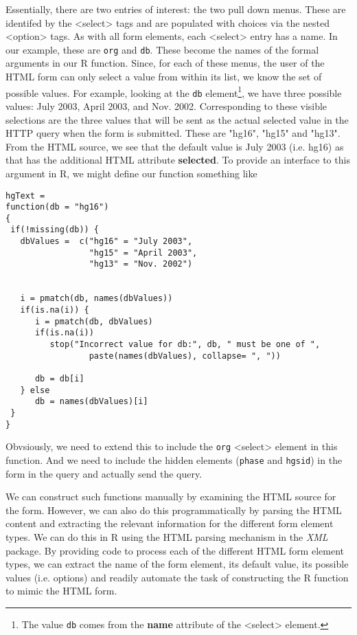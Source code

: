 \documentclass{article}
\def\HTMLTag#1{<#1>}
\def\HTMLAttr#1{\textbf{#1}}
\def\SPackage#1{\textit{#1}}
\begin{document}
Essentially, there are two entries of interest: the two pull down
menus. These are identifed by the \HTMLTag{select} tags and are
populated with choices via the nested \HTMLTag{option} tags.
As with all form elements, each 
\HTMLTag{select} entry has a name.
In our example, these are  \texttt{org} and \texttt{db}.
These become the names of the formal arguments in our
R function.
Since, for each of these menus, the user of the HTML form can only select
a value from within its list, we know the set of possible values.
For example, looking at the \texttt{db} element\footnote{The value
\texttt{db} comes from the \HTMLAttr{name} attribute of the
\HTMLTag{select} element.}, we
have three possible values:
 July 2003, April 2003, and  Nov. 2002.
Corresponding to these visible selections
are the three values that will be sent as
the actual selected value in the HTTP query
when the form is submitted. These are 
"hg16", "hg15" and "hg13".
From the HTML source, we see that the 
default value is July 2003 (i.e. hg16) as that
has the additional HTML attribute 
\HTMLAttr{selected}.
To provide an interface to this argument in R,
we might define our function something like
\begin{verbatim}
hgText =
function(db = "hg16") 
{
 if(!missing(db)) {
   dbValues =  c("hg16" = "July 2003",
                 "hg15" = "April 2003",
                 "hg13" = "Nov. 2002")

   
   i = pmatch(db, names(dbValues))
   if(is.na(i)) {
      i = pmatch(db, dbValues)
      if(is.na(i))
         stop("Incorrect value for db:", db, " must be one of ",  
                 paste(names(dbValues), collapse= ", "))
      
      db = db[i]
   } else 
      db = names(dbValues)[i]
 }
}
\end{verbatim}

Obvsiously, we need to extend this to include the
\texttt{org} \HTMLTag{select} element in this function.
And we need to include the hidden elements
(\texttt{phase} and \texttt{hgsid}) in the form in
the query and actually send the query.

We can construct such functions manually by examining the HTML source
for the form.  However, we can also do this programmatically by
parsing the HTML content and extracting the relevant information for
the different form element types.  We can do this in R using the HTML
parsing mechanism in the \SPackage{XML} package.  By providing code to
process each of the different HTML form element types, we can extract
the name of the form element, its default value, its possible values
(i.e. options) and readily automate the task of constructing the R
function to mimic the HTML form.
\end{document}
